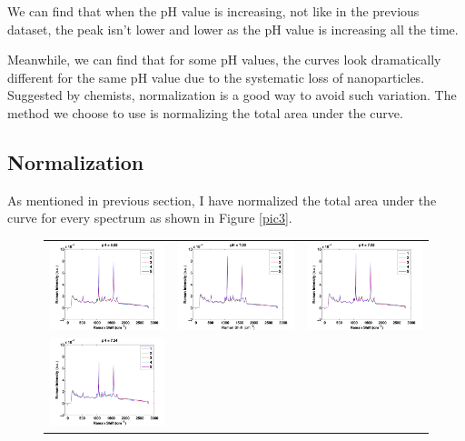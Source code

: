 \documentclass[a4paper]{article}
\begin{document}
We can find that when the pH value is increasing, not like in the previous dataset, the peak isn't lower and lower as the pH value is increasing all the time.

Meanwhile, we can find that for some pH values, the curves look dramatically different for the same pH value due to the systematic loss of nanoparticles. Suggested by chemists, normalization is a good way to avoid such variation. The method we choose to use is normalizing the total area under the curve.
\subsection{Normalization}
As mentioned in previous section, I have normalized the total area under the curve for every spectrum as shown in Figure \ref{pic3}.
\begin{figure}[h]
\centering
\begin{tabular}{ccc}
\includegraphics[width=.33\textwidth]{images/n1.pdf}  & 
\includegraphics[width=.33\textwidth]{images/n2.pdf}  &
\includegraphics[width=.33\textwidth]{images/n3.pdf}  \\ 
\includegraphics[width=.33\textwidth]{images/n4.pdf}  &

\end{tabular}
\end{figure}
\end{document}
